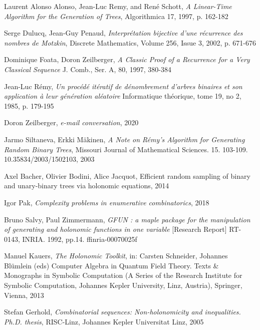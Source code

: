 \documentclass[final]{article}
\theoremstyle{definition}
\theoremstyle{remark}
\begin{document}
\clearpage

\begin{thebibliography}{9}
    Laurent Alonso Alonso, Jean-Luc Remy, and René Schott,
    \textit{A Linear-Time Algorithm for the Generation of Trees},
    Algorithmica 17,
    1997,
    p. 162-182

    Serge Dulucq, Jean-Guy Penaud,
    \textit{Interprétation bijective d'une récurrence des nombres de Motzkin},
    Discrete Mathematics,
    Volume 256, Issue 3,
    2002,
    p. 671-676

    Dominique Foata, Doron Zeilberger,
    \textit{A Classic Proof of a Recurrence for a Very Classical Sequence}
    J. Comb., Ser. A, 80,
    1997, 380-384

    Jean-Luc Rémy,
    \textit{Un procédé itératif de dénombrement d’arbres binaires et son application à leur génération aléatoire}
    Informatique théorique, tome 19, no 2, 
    1985,
    p. 179-195

    Doron Zeilberger,
    \textit{e-mail conversation},
    2020

    Jarmo Siltaneva, Erkki Mäkinen,
    \textit{A Note on Rémy's Algorithm for Generating Random Binary Trees},
    Missouri Journal of Mathematical Sciences. 15. 103-109. 10.35834/2003/1502103,
    2003 

    Axel Bacher, Olivier Bodini, Alice Jacquot,
    Efficient random sampling of binary and unary-binary trees via holonomic equations,
    2014

    Igor Pak,
    \textit{Complexity problems in enumerative combinatorics},
    2018

    Bruno Salvy, Paul Zimmermann,
    \textit{GFUN : a maple package for the manipulation of generating and holonomic functions in one variable}
    [Research Report] RT-0143, INRIA. 1992, pp.14. ffinria-00070025f

    Manuel Kauers,
    \textit{The Holonomic Toolkit},
    in: Carsten Schneider, Johannes Blümlein (eds) Computer Algebra in Quantum Field Theory. Texts \& Monographs in Symbolic Computation (A Series of the Research Institute for Symbolic Computation, Johannes Kepler University, Linz, Austria),
    Springer, Vienna,
    2013

    Stefan Gerhold,
    \textit{Combinatorial sequences: Non-holonomicity and inequalities. Ph.D. thesis},
    RISC-Linz, Johannes Kepler Universitat Linz,
    2005

\end{thebibliography}
\end{document}
